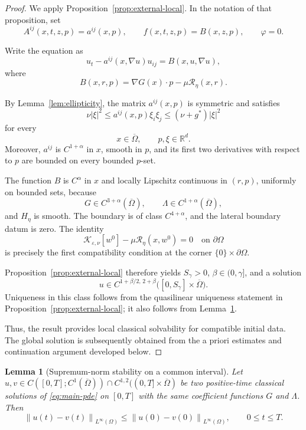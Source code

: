 \documentclass[11pt]{article}
\newtheorem{lemma}[theorem]{Lemma}
\theoremstyle{remark}
\newcommand{\norm}[1]{\left\lVert #1\right\rVert}
\newcommand{\cT}{\mathcal{R}}
\begin{document}
\begin{proof}
We apply Proposition~\ref{prop:external-local}. In the notation of that
proposition, set
\[
A^{ij}(x,t,z,p)=a^{ij}(x,p),
\qquad
f(x,t,z,p)=B(x,z,p),
\qquad
\varphi=0.
\]

Write the equation as
\[
u_t-a^{ij}(x,\nabla u)u_{ij}=B(x,u,\nabla u),
\]
where
\[
B(x,r,p)
=
\nabla G(x)\cdot p
-
\mu\cT_\eta(x,r).
\]

By Lemma~\ref{lem:ellipticity}, the matrix $a^{ij}(x,p)$ is symmetric and
satisfies
\[
\nu |\xi|^2
\leq
a^{ij}(x,p)\xi_i\xi_j
\leq
(\nu+g^*)|\xi|^2
\]
for every
\[
x\in\overline{\Omega},
\qquad
p,\xi\in\mathbb{R}^d.
\]
Moreover, $a^{ij}$ is $C^{1+\alpha}$ in $x$, smooth in $p$, and its first two
derivatives with respect to $p$ are bounded on every bounded $p$-set.

The function $B$ is $C^\alpha$ in $x$ and locally Lipschitz continuous in
$(r,p)$, uniformly on bounded sets, because
\[
G\in C^{3+\alpha}(\overline{\Omega}),
\qquad
\Lambda\in C^{1+\alpha}(\overline{\Omega}),
\]
and $H_\eta$ is smooth. The boundary is of class $C^{4+\alpha}$, and the
lateral boundary datum is zero. The identity
\[
\mathcal{K}_{\varepsilon,\nu}[w^0]
-\mu\cT_\eta(x,w^0)=0
\quad\text{on }\partial\Omega
\]
is precisely the first compatibility condition at the corner
$\{0\}\times\partial\Omega$.

Proposition~\ref{prop:external-local} therefore yields
$S_\gamma>0$, $\beta\in(0,\gamma]$, and a solution
\[
u\in
C^{1+\beta/2,\,2+\beta}
\bigl([0,S_\gamma]\times\overline{\Omega}\bigr).
\]
Uniqueness in this class follows from the quasilinear uniqueness statement
in Proposition~\ref{prop:external-local}; it also follows from
Lemma~\ref{lem:stability-local}.

Thus, the result provides local classical solvability for compatible initial
data. The global solution is subsequently obtained from the a priori
estimates and continuation argument developed below.
\end{proof}


\begin{lemma}[Supremum-norm stability on a common interval]\label{lem:stability-local}
Let $u,v\in C([0,T];C^1(\overline\Omega))\cap C^{1,2}((0,T]\times\overline\Omega)$ be two positive-time classical solutions of \eqref{eq:main-pde} on $[0,T]$ with the same coefficient functions $G$ and $\Lambda$.  Then
\[
        \norm{u(t)-v(t)}_{L^\infty(\Omega)}
        \le \norm{u(0)-v(0)}_{L^\infty(\Omega)},
        \qquad 0\le t\le T.
\]
\end{lemma}
\end{document}
